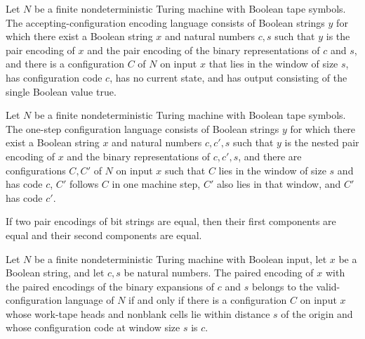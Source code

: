\begin{definition}
\label{Complexity.Codec.acceptLang}
\leanok
{}
Let $N$ be a finite nondeterministic Turing machine with Boolean tape symbols. The
accepting-configuration encoding language consists of Boolean strings $y$ for which
there exist a Boolean string $x$ and natural numbers $c,s$ such that $y$ is the pair
encoding of $x$ and the pair encoding of the binary representations of $c$ and $s$, and
there is a configuration $C$ of $N$ on input $x$ that lies in the window of size $s$,
has configuration code $c$, has no current state, and has output consisting of the
single Boolean value true.
\end{definition}

\begin{definition}
\label{Complexity.Codec.stepLang}
\leanok
{}
Let $N$ be a finite nondeterministic Turing machine with Boolean tape symbols. The
one-step configuration language consists of Boolean strings $y$ for which there exist a
Boolean string $x$ and natural numbers $c,c',s$ such that $y$ is the nested pair
encoding of $x$ and the binary representations of $c,c',s$, and there are configurations
$C,C'$ of $N$ on input $x$ such that $C$ lies in the window of size $s$ and has code
$c$, $C'$ follows $C$ in one machine step, $C'$ also lies in that window, and $C'$ has
code $c'$.
\end{definition}

\begin{lemma}
\label{Complexity.Codec.pairEncode_inj}
\leanok
{}
If two pair encodings of bit strings are equal, then their first components are equal
and their second components are equal.
\end{lemma}

\begin{theorem}
\label{Complexity.Codec.mem_validLang}
\leanok
{}
Let $N$ be a finite nondeterministic Turing machine with Boolean input, let $x$ be a
Boolean string, and let $c,s$ be natural numbers. The paired encoding of $x$ with the
paired encodings of the binary expansions of $c$ and $s$ belongs to the
valid-configuration language of $N$ if and only if there is a configuration $C$ on input
$x$ whose work-tape heads and nonblank cells lie within distance $s$ of the origin and
whose configuration code at window size $s$ is $c$.
\end{theorem}

